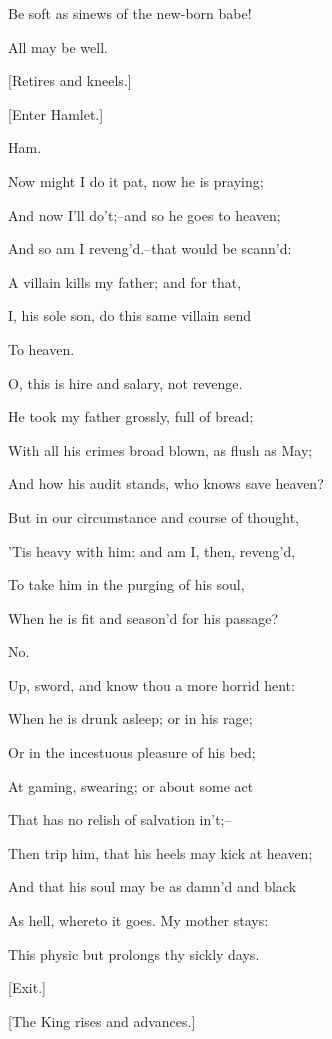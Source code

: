 \documentclass[12pt]{book}
\begin{document}
Be soft as sinews of the new-born babe!

All may be well.



[Retires and kneels.]



[Enter Hamlet.]



Ham.

Now might I do it pat, now he is praying;

And now I'll do't;--and so he goes to heaven;

And so am I reveng'd.--that would be scann'd:

A villain kills my father; and for that,

I, his sole son, do this same villain send

To heaven.

O, this is hire and salary, not revenge.

He took my father grossly, full of bread;

With all his crimes broad blown, as flush as May;

And how his audit stands, who knows save heaven?

But in our circumstance and course of thought,

'Tis heavy with him: and am I, then, reveng'd,

To take him in the purging of his soul,

When he is fit and season'd for his passage?

No.

Up, sword, and know thou a more horrid hent:

When he is drunk asleep; or in his rage;

Or in the incestuous pleasure of his bed;

At gaming, swearing; or about some act

That has no relish of salvation in't;--

Then trip him, that his heels may kick at heaven;

And that his soul may be as damn'd and black

As hell, whereto it goes. My mother stays:

This physic but prolongs thy sickly days.



[Exit.]



[The King rises and advances.]
\end{document}
